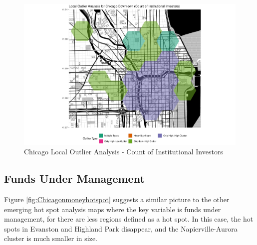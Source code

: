 \begin{figure}
	\centering
	\includegraphics[width=1\linewidth]{Figures/ChapterIV/Chi_Count_LO_Downtown}
	\caption[Downtown Chicago Local Outlier Analysis - Count of Institutional Investors 1999-2018]{Chicago Local Outlier Analysis - Count of Institutional Investors}
	\label{fig:Chicagocountlocaloutliercount_Downtown}
\end{figure}	

\subsection{Funds Under Management}

Figure \ref{fig:Chicagonmoneyhotspot} suggests a similar picture to the other emerging hot spot analysis maps where the key variable is funds under management, for there are less regions defined as a hot spot.  In this case, the hot spots in Evanston and Highland Park disappear, and the Napierville-Aurora cluster is much smaller in size.    

